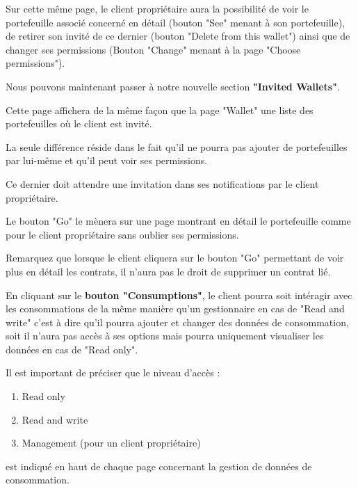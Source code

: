 \begin{flushleft}
Sur cette même page, le client propriétaire aura la possibilité de voir le portefeuille associé concerné en détail (bouton "See" menant à son portefeuille), de retirer son invité de ce dernier (bouton "Delete from this wallet") ainsi que de changer ses permissions (Bouton "Change" menant à la page "Choose permissions").
\end{flushleft}


\newpage

\begin{flushleft}
Nous pouvons maintenant passer à notre nouvelle section \textbf{"Invited Wallets"}.
\end{flushleft}
\begin{flushleft}
Cette page affichera de la même façon que la page "Wallet" une liste des portefeuilles où le client est invité.
\end{flushleft}
\begin{flushleft}
La seule différence réside dans le fait qu'il ne pourra pas ajouter de portefeuilles par lui-même et qu'il peut voir ses permissions.
\end{flushleft}
\begin{flushleft}
Ce dernier doit attendre une invitation dans ses notifications par le client propriétaire.
\end{flushleft}

\begin{flushleft}
Le bouton "Go" le mènera sur une page montrant en détail le portefeuille comme pour le client propriétaire sans oublier ses permissions.
\end{flushleft}

\begin{flushleft}
Remarquez que lorsque le client cliquera sur le bouton "Go" permettant de voir plus en détail les contrats, il n'aura pas le droit de supprimer un contrat lié.
\end{flushleft}

\begin{flushleft}
En cliquant sur le \textbf{bouton "Consumptions"}, le client pourra soit intéragir avec les consommations de la même manière qu'un gestionnaire en cas de "Read and write" c'est à dire qu'il pourra ajouter et changer des données de consommation, soit il n'aura pas accès à ses options mais pourra uniquement visualiser les données en cas de "Read only".
\end{flushleft}

\begin{flushleft}
Il est important de préciser que le niveau d'accès :
\end{flushleft}\begin{enumerate}
\item Read only
\item Read and write
\item Management (pour un client propriétaire)
\end{enumerate}
\begin{flushleft}
est indiqué en haut de chaque page concernant la gestion de données de consommation.
\end{flushleft}

